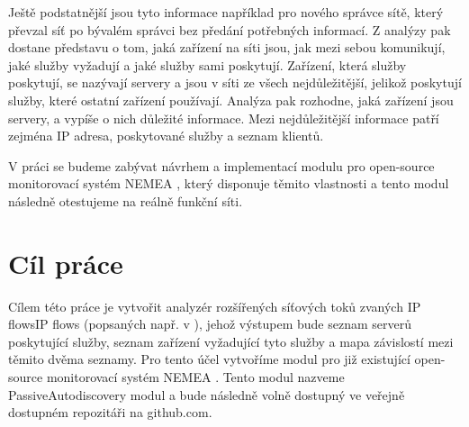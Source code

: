 \documentclass[thesis=B,czech,hidelinks]{FITthesis}[2019/03/21]
\begin{document}
\begin{introduction}
Ještě podstatnější jsou tyto informace například pro nového správce sítě, který převzal síť po bývalém správci bez předání potřebných informací. Z analýzy pak dostane představu o tom, jaká zařízení na síti jsou, jak mezi sebou komunikují, jaké služby vyžadují a jaké služby sami poskytují. Zařízení, která služby poskytují, se nazývají servery a jsou v síti ze všech nejdůležitější, jelikož poskytují služby, které ostatní zařízení používají. Analýza pak rozhodne, jaká zařízení jsou servery, a vypíše o nich důležité informace. Mezi nejdůležitější informace patří zejména IP adresa, poskytované služby a seznam klientů.

V práci se budeme zabývat návrhem a implementací modulu pro open-source monitorovací systém NEMEA  \cite{NEMEA}, který disponuje těmito vlastnosti a tento modul následně otestujeme na reálně funkční síti.

\end{introduction}
\chapter{Cíl práce}
Cílem této práce je vytvořit analyzér rozšířených síťových toků zvaných IP flowsIP flows (popsaných např. v \cite{flowmonitoring}), jehož výstupem bude seznam serverů poskytující služby, seznam zařízení vyžadující tyto služby a mapa závislostí mezi těmito dvěma seznamy. Pro tento účel vytvoříme modul pro již existující open-source monitorovací systém NEMEA \cite{NEMEA}. Tento modul nazveme PassiveAutodiscovery modul a bude následně volně dostupný ve veřejně dostupném repozitáři na github.com.
\end{document}
